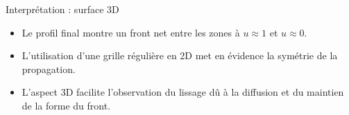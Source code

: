 \documentclass[10pt]{beamer}
\begin{document}
\begin{frame}{Interprétation : surface 3D}
  \begin{itemize}
    \item Le profil final montre un front net entre les zones à $u\approx1$ et $u\approx0$.
    \item L'utilisation d'une grille régulière en 2D met en évidence la symétrie de la propagation.
    \item L'aspect 3D facilite l'observation du lissage dû à la diffusion et du maintien de la forme du front.
  \end{itemize}
\end{frame}
\end{document}
